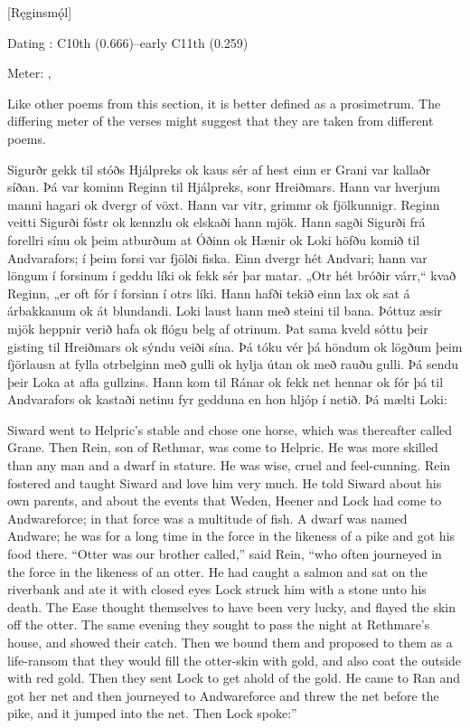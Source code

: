 [Ręginsmǫ́l]

\begin{flushright}%
Dating \parencite{Sapp2022}: C10th (0.666)–early C11th (0.259)

Meter: \Ljodahattr, \Fornyrdislag%
\end{flushright}

Like other poems from this section, it is better defined as a prosimetrum. The differing meter of the verses might suggest that they are taken from different poems.

\sectionline

\bpg\bpa Sigurðr gekk til stóðs Hjálpreks ok kaus sér af hest einn er Grani var kallaðr síðan. Þá var kominn Reginn til Hjálpreks, sonr Hreiðmars. Hann var hverjum manni hagari ok dvergr of vöxt. Hann var vitr, grimmr ok fjölkunnigr. Reginn veitti Sigurði fóstr ok kennzlu ok elskaði hann mjök. Hann sagði Sigurði frá forellri sínu ok þeim atburðum at Óðinn ok Hænir ok Loki höfðu komið til Andvarafors; í þeim forsi var fjölði fiska. Einn dvergr hét Andvari; hann var löngum í forsinum í geddu líki ok fekk sér þar matar. „Otr hét bróðir várr,“ kvað Reginn, „er oft fór í forsinn í otrs líki. Hann hafði tekið einn lax ok sat á árbakkanum ok át blundandi. Loki laust hann með steini til bana. Þóttuz æsir mjök heppnir verið hafa ok flógu belg af otrinum. Þat sama kveld sóttu þeir gisting til Hreiðmars ok sýndu veiði sína. Þá tóku vér þá höndum ok lögðum þeim fjörlausn at fylla otrbelginn með gulli ok hylja útan ok með rauðu gulli. Þá sendu þeir Loka at afla gullzins. Hann kom til Ránar ok fekk net hennar ok fór þá til Andvarafors ok kastaði netinu fyr gedduna en hon hljóp í netið. Þá mælti Loki:\epa

\bpb Siward went to Helpric’s stable and chose one horse, which was thereafter called Grane. Then Rein, son of Rethmar, was come to Helpric. He was more skilled than any man and a dwarf in stature. He was wise, cruel and feel-cunning. Rein fostered and taught Siward and love him very much. He told Siward about his own parents, and about the events that Weden, Heener and Lock had come to Andwareforce; in that force was a multitude of fish. A dwarf was named Andware; he was for a long time in the force in the likeness of a pike and got his food there. “Otter was our brother called,” said Rein, “who often journeyed in the force in the likeness of an otter. He had caught a salmon and sat on the riverbank and ate it with closed eyes Lock struck him with a stone unto his death. The Ease thought themselves to have been very lucky, and flayed the skin off the otter. The same evening they sought to pass the night at Rethmare’s house, and showed their catch. Then we bound them and proposed to them as a life-ransom that they would fill the otter-skin with gold, and also coat the outside with red gold. Then they sent Lock to get ahold of the gold. He came to Ran and got her net and then journeyed to Andwareforce and threw the net before the pike, and it jumped into the net. Then Lock spoke:”\epb\epg


